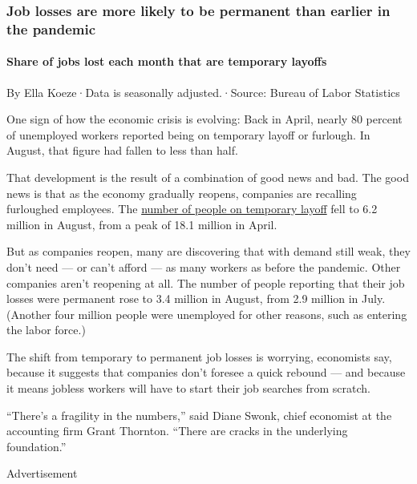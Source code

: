 \hypertarget{job-losses-are-more-likely-to-be-permanent-than-earlier-in-the-pandemic}{%
\subsubsection{Job losses are more likely to be permanent than earlier
in the
pandemic}\label{job-losses-are-more-likely-to-be-permanent-than-earlier-in-the-pandemic}}

\hypertarget{share-of-jobs-lost-each-month-that-are-temporary-layoffs}{%
\paragraph{Share of jobs lost each month that are temporary
layoffs}\label{share-of-jobs-lost-each-month-that-are-temporary-layoffs}}

By Ella Koeze·Data is seasonally adjusted.·Source: Bureau of Labor
Statistics

One sign of how the economic crisis is evolving: Back in April, nearly
80 percent of unemployed workers reported being on temporary layoff or
furlough. In August, that figure had fallen to less than half.

That development is the result of a combination of good news and bad.
The good news is that as the economy gradually reopens, companies are
recalling furloughed employees. The
\href{https://www.bls.gov/news.release/empsit.t11.htm}{number of people
on temporary layoff} fell to 6.2 million in August, from a peak of 18.1
million in April.

But as companies reopen, many are discovering that with demand still
weak, they don't need --- or can't afford --- as many workers as before
the pandemic. Other companies aren't reopening at all. The number of
people reporting that their job losses were permanent rose to 3.4
million in August, from 2.9 million in July. (Another four million
people were unemployed for other reasons, such as entering the labor
force.)

The shift from temporary to permanent job losses is worrying, economists
say, because it suggests that companies don't foresee a quick rebound
--- and because it means jobless workers will have to start their job
searches from scratch.

``There's a fragility in the numbers,'' said Diane Swonk, chief
economist at the accounting firm Grant Thornton. ``There are cracks in
the underlying foundation.''

Advertisement

